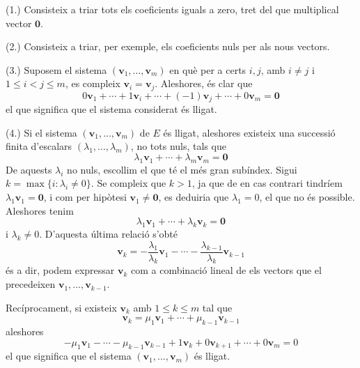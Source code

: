 \begin{prova}
(1.) Consisteix a triar tots els coeficients iguals a zero, tret del que
multiplical vector $\mathbf{0}$.

(2.) Consisteix a triar, per exemple, els coeficients nuls per als nous
vectors.

(3.) Suposem el sistema $(\mathbf{v}_{1},...,\mathbf{v}_{m})$ en què
per a certs $i,j$, amb $i\neq j$ i $1\leq i<j\leq m$, es compleix $\mathbf{v}%
_{i}=\mathbf{v}_{j}$. Aleshores, és clar que 
\begin{equation*}
0\mathbf{v}_{1}+\cdots +1\mathbf{v}_{i}+\cdots +(-1)\mathbf{v}_{j}+\cdots +0%
\mathbf{v}_{m}=\mathbf{0}
\end{equation*}%
el que significa que el sistema considerat és lligat.

(4.) Si el sistema $(\mathbf{v}_{1},...,\mathbf{v}_{m})$ de $E$ és
lligat, aleshores existeix una successió finita d'escalars $\left( \lambda
_{1},...,\lambda _{m}\right) $, no tots nuls, tals que%
\begin{equation*}
\lambda _{1}\mathbf{v}_{1}+\cdots +\lambda _{m}\mathbf{v}_{m}=\mathbf{0}
\end{equation*}%
De aquests $\lambda _{i}$ no nuls, escollim el que té el més gran subíndex. Sigui $k=\max \{i:\lambda _{i}\neq 0\}$. Se compleix que $k>1$, ja que de
en cas contrari tindríem $\lambda _{1}\mathbf{v}_{1}=\mathbf{0}$, i com
per hipòtesi $\mathbf{v}_{1}\neq \mathbf{0}$, es deduiria que $%
\lambda _{1}=0$, el que no és possible. Aleshores tenim%
\begin{equation*}
\lambda _{1}\mathbf{v}_{1}+\cdots +\lambda _{k}\mathbf{v}_{k}=\mathbf{0}
\end{equation*}%
i $\lambda _{k}\neq 0$. D'aquesta última relació s’obté%
\begin{equation*}
\mathbf{v}_{k}=-\frac{\lambda _{1}}{\lambda _{k}}\mathbf{v}_{1}-\cdots -%
\frac{\lambda _{k-1}}{\lambda _{k}}\mathbf{v}_{k-1}
\end{equation*}%
és a dir, podem expressar $\mathbf{v}_{k}$ com a combinació lineal de
els vectors que el precedeixen $\mathbf{v}_{1},...,\mathbf{v}_{k-1}$.

Recíprocament, si existeix $\mathbf{v}_{k}$ amb $1\leq k\leq m$ tal que%
\begin{equation*}
\mathbf{v}_{k}=\mu _{1}\mathbf{v}_{1}+\cdots +\mu _{k-1}\mathbf{v}_{k-1}
\end{equation*}%
aleshores%
\begin{equation*}
-\mu _{1}\mathbf{v}_{1}-\cdots -\mu _{k-1}\mathbf{v}_{k-1}+1\mathbf{v}_{k}+0%
\mathbf{v}_{k+1}+\cdots +0\mathbf{v}_{m}=0
\end{equation*}%
el que significa que el sistema $(\mathbf{v}_{1},...,\mathbf{v}_{m})$ és
lligat.


\end{prova}
